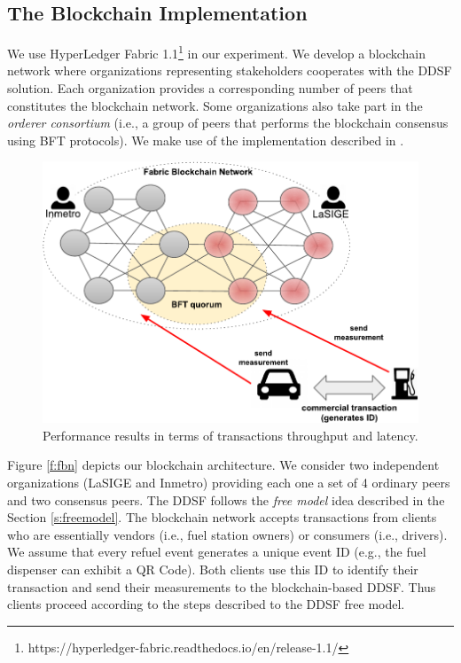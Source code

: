 \documentclass[sigplan]{acmart}
\begin{document}
\subsection{The Blockchain Implementation}
We use HyperLedger Fabric 1.1\footnote{https://hyperledger-fabric.readthedocs.io/en/release-1.1/} in our experiment.
We develop a blockchain network where organizations representing stakeholders cooperates with the DDSF solution.
Each organization provides a corresponding number of peers that constitutes the blockchain network.
Some organizations also take part in the \textit{orderer consortium} (i.e., a group of peers that performs the blockchain consensus using BFT protocols).
We make use of the implementation described in \cite{Sousa2018}.

\begin{figure}[!t]
\centering
\includegraphics[width=.4\textwidth]{fbn}
\caption{Performance results in terms of transactions throughput and latency.}
\label{f:performance}
\end{figure}

Figure \ref{f:fbn} depicts our blockchain architecture. 
We consider two independent organizations (LaSIGE and Inmetro) providing each one a set of 4 ordinary peers and two consensus peers.
The DDSF follows the \emph{free model} idea described in the Section \ref{s:freemodel}.
The blockchain network accepts transactions from clients who are essentially vendors (i.e., fuel station owners) or consumers (i.e., drivers).
We assume that every refuel event generates a unique event ID (e.g., the fuel dispenser can exhibit a QR Code).
Both clients use this ID to identify their transaction and send their measurements to the blockchain-based DDSF.
Thus clients proceed according to the steps described to the DDSF free model.
\end{document}
